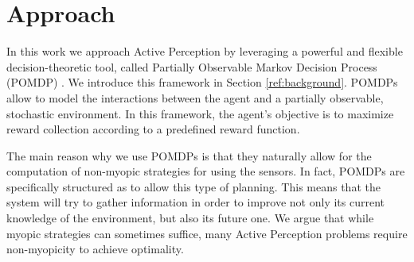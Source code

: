 %
%

\section{Approach}

In this work we approach Active Perception by leveraging a powerful and flexible decision-theoretic
tool, called Partially Observable Markov Decision Process (POMDP) \cite{cit:pomdp}. We introduce
this framework in Section \ref{ref:background}. POMDPs allow to model the interactions between the
agent and a partially observable, stochastic environment.  In this framework, the agent's objective
is to maximize reward collection according to a predefined reward function.

The main reason why we use POMDPs is that they naturally allow for the computation of non-myopic
strategies for using the sensors. In fact, POMDPs are specifically structured as to allow this type
of planning. This means that the system will try to gather information in order to improve not only
its current knowledge of the environment, but also its future one.  We argue that while myopic
strategies can sometimes suffice, many Active Perception problems require non-myopicity to achieve
optimality.


